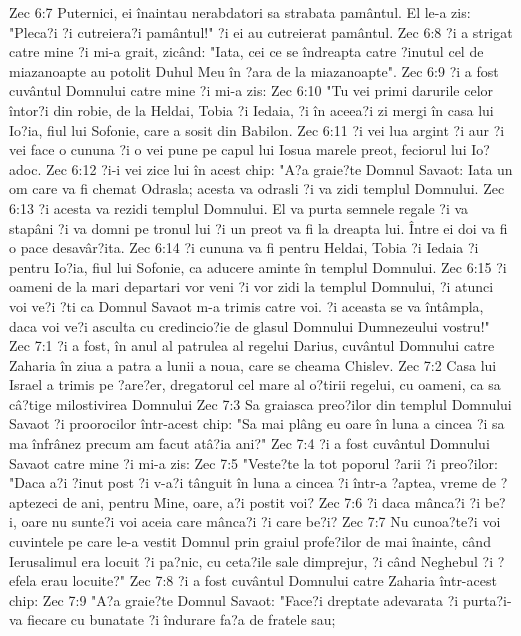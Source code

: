 Zec 6:7  Puternici, ei înaintau nerabdatori sa strabata pamântul. El le-a zis: "Pleca?i ?i cutreiera?i pamântul!" ?i ei au cutreierat pamântul.
Zec 6:8  ?i a strigat catre mine ?i mi-a grait, zicând: "Iata, cei ce se îndreapta catre ?inutul cel de miazanoapte au potolit Duhul Meu în ?ara de la miazanoapte".
Zec 6:9  ?i a fost cuvântul Domnului catre mine ?i mi-a zis:
Zec 6:10  "Tu vei primi darurile celor întor?i din robie, de la Heldai, Tobia ?i Iedaia, ?i în aceea?i zi mergi în casa lui Io?ia, fiul lui Sofonie, care a sosit din Babilon.
Zec 6:11  ?i vei lua argint ?i aur ?i vei face o cununa ?i o vei pune pe capul lui Iosua marele preot, feciorul lui Io?adoc.
Zec 6:12  ?i-i vei zice lui în acest chip: "A?a graie?te Domnul Savaot: Iata un om care va fi chemat Odrasla; acesta va odrasli ?i va zidi templul Domnului.
Zec 6:13  ?i acesta va rezidi templul Domnului. El va purta semnele regale ?i va stapâni ?i va domni pe tronul lui ?i un preot va fi la dreapta lui. Între ei doi va fi o pace desavâr?ita.
Zec 6:14  ?i cununa va fi pentru Heldai, Tobia ?i Iedaia ?i pentru Io?ia, fiul lui Sofonie, ca aducere aminte în templul Domnului.
Zec 6:15  ?i oameni de la mari departari vor veni ?i vor zidi la templul Domnului, ?i atunci voi ve?i ?ti ca Domnul Savaot m-a trimis catre voi. ?i aceasta se va întâmpla, daca voi ve?i asculta cu credincio?ie de glasul Domnului Dumnezeului vostru!"
Zec 7:1  ?i a fost, în anul al patrulea al regelui Darius, cuvântul Domnului catre Zaharia în ziua a patra a lunii a noua, care se cheama Chislev.
Zec 7:2  Casa lui Israel a trimis pe ?are?er, dregatorul cel mare al o?tirii regelui, cu oameni, ca sa câ?tige milostivirea Domnului
Zec 7:3  Sa graiasca preo?ilor din templul Domnului Savaot ?i proorocilor într-acest chip: "Sa mai plâng eu oare în luna a cincea ?i sa ma înfrânez precum am facut atâ?ia ani?"
Zec 7:4  ?i a fost cuvântul Domnului Savaot catre mine ?i mi-a zis:
Zec 7:5  "Veste?te la tot poporul ?arii ?i preo?ilor: "Daca a?i ?inut post ?i v-a?i tânguit în luna a cincea ?i într-a ?aptea, vreme de ?aptezeci de ani, pentru Mine, oare, a?i postit voi?
Zec 7:6  ?i daca mânca?i ?i be?i, oare nu sunte?i voi aceia care mânca?i ?i care be?i?
Zec 7:7  Nu cunoa?te?i voi cuvintele pe care le-a vestit Domnul prin graiul profe?ilor de mai înainte, când Ierusalimul era locuit ?i pa?nic, cu ceta?ile sale dimprejur, ?i când Neghebul ?i ?efela erau locuite?"
Zec 7:8  ?i a fost cuvântul Domnului catre Zaharia într-acest chip:
Zec 7:9  "A?a graie?te Domnul Savaot: "Face?i dreptate adevarata ?i purta?i-va fiecare cu bunatate ?i îndurare fa?a de fratele sau;
